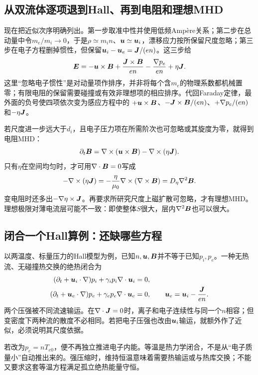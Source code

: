 \subsection{从双流体逐项退到Hall、再到电阻和理想MHD}
现在把近似次序明确列出。第一步取准中性并使用低频Ampère关系；第二步在总动量中令$m_e/m_i\to0$，于是$\rho\simeq m_in$、$\bm{u}\simeq\bm{u}_i$，漂移应力按所保留尺度忽略；第三步在电子方程删掉惯性，但保留$\bm{u}_i-\bm{u}_e=\bm{J}/(en)$。这三步给
\begin{equation}
 \bm{E}=-\bm{u}\times\bm{B}+{\bm{J}\times\bm{B}\over en}
      -{\nabla p_e\over en}+\eta\bm{J}.
\end{equation}
这里“忽略电子惯性”是对动量项作排序，并非将每个含$m_e$的物理系数都机械置零；有限电阻的保留需要碰撞或有效非理想项的相应排序。代回Faraday定律，最外面的负号使四项依次变为感应方程中的
$+\bm{u}\times\bm{B}$、$-\bm{J}\times\bm{B}/(en)$、$+\nabla p_e/(en)$和$-\eta\bm{J}$。

若尺度进一步远大于$d_i$，且电子压力项在所需阶次也可忽略或其旋度为零，就得到电阻MHD：
\begin{equation}
 \partial_t\bm{B}=\nabla\times(\bm{u}\times\bm{B})-\nabla\times(\eta\bm{J}).
\end{equation}
只有$\eta$在空间均匀时，才可用$\nabla\cdot\bm{B}=0$写成
\begin{equation}
 -\nabla\times(\eta\bm{J})
 =-{\eta\over\mu_0}\nabla\times(\nabla\times\bm{B})
 =D_\eta\nabla^2\bm{B}.
\end{equation}
变电阻时还多出$-\nabla\eta\times\bm{J}$。再要求所研究尺度上磁扩散可忽略，才有理想MHD。理想极限对薄电流层可能不一致：即使整体$S$很大，层内$\nabla^2\bm{B}$也可以很大。

\subsection{闭合一个Hall算例：还缺哪些方程}
以两温度、标量压力的Hall模型为例，已知$n,\bm{u},\bm{B}$并不等于已知$p_i,p_e$。一种无热流、无碰撞热交换的绝热闭合为
\begin{align}
 (\partial_t+\bm{u}_i\cdot\nabla)p_i+\gamma_i p_i\nabla\cdot\bm{u}_i&=0,\\
 (\partial_t+\bm{u}_e\cdot\nabla)p_e+\gamma_e p_e\nabla\cdot\bm{u}_e&=0,\qquad
 \bm{u}_e=\bm{u}_i-{\bm{J}\over en}.
\end{align}
两个压强被不同流速输运。在$\nabla\cdot\bm{J}=0$时，离子和电子连续性与同一个$n$相容；但变密度下两种流的散度不必相同。若把电子压强也改由$\bm{u}_i$输运，就额外作了近似，必须说明其尺度依据。

若改为$p_e=nT_{e0}$，便不再独立推进电子内能。等温是热力学闭合，不是从“电子质量小”自动推出来的。强压缩时，维持恒温意味着需要热输运或与热库交换；不能又要求这套等温方程满足孤立绝热能量守恒。

